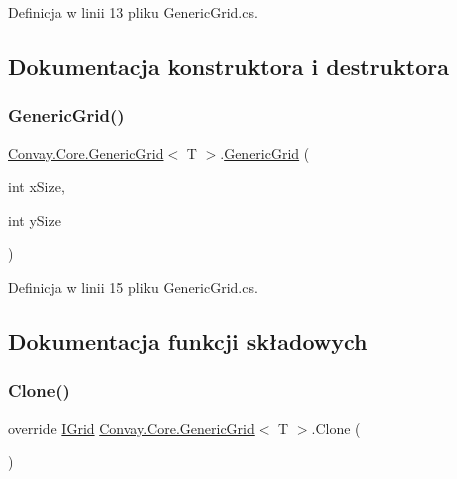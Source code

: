 Definicja w linii 13 pliku Generic\+Grid.\+cs.



\subsection{Dokumentacja konstruktora i destruktora}
\hypertarget{class_convay_1_1_core_1_1_generic_grid_a3507e1f2a0efa825457ad47b6c4121b2}{}\label{class_convay_1_1_core_1_1_generic_grid_a3507e1f2a0efa825457ad47b6c4121b2} 
\subsubsection{\texorpdfstring{Generic\+Grid()}{GenericGrid()}}
{\footnotesize\ttfamily \hyperlink{class_convay_1_1_core_1_1_generic_grid}{Convay.\+Core.\+Generic\+Grid}$<$ T $>$.\hyperlink{class_convay_1_1_core_1_1_generic_grid}{Generic\+Grid} (\begin{DoxyParamCaption}\item[{int}]{x\+Size,  }\item[{int}]{y\+Size }\end{DoxyParamCaption})}



Definicja w linii 15 pliku Generic\+Grid.\+cs.



\subsection{Dokumentacja funkcji składowych}
\hypertarget{class_convay_1_1_core_1_1_generic_grid_af2556688d2c1a33797ce8f79d15836b4}{}\label{class_convay_1_1_core_1_1_generic_grid_af2556688d2c1a33797ce8f79d15836b4} 
\subsubsection{\texorpdfstring{Clone()}{Clone()}}
{\footnotesize\ttfamily override \hyperlink{interface_convay_1_1_core_1_1_interfaces_1_1_i_grid}{I\+Grid} \hyperlink{class_convay_1_1_core_1_1_generic_grid}{Convay.\+Core.\+Generic\+Grid}$<$ T $>$.Clone (\begin{DoxyParamCaption}{ }\end{DoxyParamCaption})\hspace{0.3cm}{\ttfamily [virtual]}}



